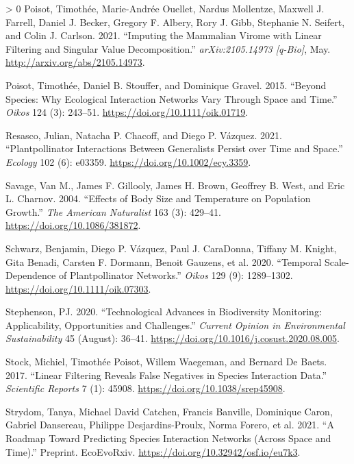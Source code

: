 \documentclass[10pt,oneside]{article}
\newlength{\cslhangindent}
\newenvironment{CSLReferences}[3] %
 {%
  \setlength{\parindent}{0pt}
  \ifodd #1 \everypar{\setlength{\hangindent}{\cslhangindent}}\ignorespaces\fi
  \ifnum #2 > 0
  \setlength{\parskip}{#2\baselineskip}
  \fi
 }%
 {}
\begin{document}
\begin{CSLReferences}{1}{0}
\leavevmode\hypertarget{ref-Poisot2021ImpMam}{}%
Poisot, Timothée, Marie-Andrée Ouellet, Nardus Mollentze, Maxwell J.
Farrell, Daniel J. Becker, Gregory F. Albery, Rory J. Gibb, Stephanie N.
Seifert, and Colin J. Carlson. 2021. {``Imputing the Mammalian Virome
with Linear Filtering and Singular Value Decomposition.''}
\emph{arXiv:2105.14973 {[}q-Bio{]}}, May.
\url{http://arxiv.org/abs/2105.14973}.

\leavevmode\hypertarget{ref-Poisot2015SpeWhy}{}%
Poisot, Timothée, Daniel B. Stouffer, and Dominique Gravel. 2015.
{``Beyond Species: Why Ecological Interaction Networks Vary Through
Space and Time.''} \emph{Oikos} 124 (3): 243--51.
\url{https://doi.org/10.1111/oik.01719}.

\leavevmode\hypertarget{ref-Resasco2021PlaPol}{}%
Resasco, Julian, Natacha P. Chacoff, and Diego P. Vázquez. 2021.
{``Plantpollinator Interactions Between Generalists Persist over Time
and Space.''} \emph{Ecology} 102 (6): e03359.
\url{https://doi.org/10.1002/ecy.3359}.

\leavevmode\hypertarget{ref-Savage2004EffBod}{}%
Savage, Van M., James F. Gillooly, James H. Brown, Geoffrey B. West, and
Eric L. Charnov. 2004. {``Effects of Body Size and Temperature on
Population Growth.''} \emph{The American Naturalist} 163 (3): 429--41.
\url{https://doi.org/10.1086/381872}.

\leavevmode\hypertarget{ref-Schwarz2020TemSca}{}%
Schwarz, Benjamin, Diego P. Vázquez, Paul J. CaraDonna, Tiffany M.
Knight, Gita Benadi, Carsten F. Dormann, Benoit Gauzens, et al. 2020.
{``Temporal Scale-Dependence of Plantpollinator Networks.''}
\emph{Oikos} 129 (9): 1289--1302.
\url{https://doi.org/10.1111/oik.07303}.

\leavevmode\hypertarget{ref-Stephenson2020TecAdv}{}%
Stephenson, PJ. 2020. {``Technological Advances in Biodiversity
Monitoring: Applicability, Opportunities and Challenges.''}
\emph{Current Opinion in Environmental Sustainability} 45 (August):
36--41. \url{https://doi.org/10.1016/j.cosust.2020.08.005}.

\leavevmode\hypertarget{ref-Stock2017LinFil}{}%
Stock, Michiel, Timothée Poisot, Willem Waegeman, and Bernard De Baets.
2017. {``Linear Filtering Reveals False Negatives in Species Interaction
Data.''} \emph{Scientific Reports} 7 (1): 45908.
\url{https://doi.org/10.1038/srep45908}.

\leavevmode\hypertarget{ref-Strydom2021RoaPre}{}%
Strydom, Tanya, Michael David Catchen, Francis Banville, Dominique
Caron, Gabriel Dansereau, Philippe Desjardins-Proulx, Norma Forero, et
al. 2021. {``A Roadmap Toward Predicting Species Interaction Networks
(Across Space and Time).''} Preprint. EcoEvoRxiv.
\url{https://doi.org/10.32942/osf.io/eu7k3}.


\end{CSLReferences}
\end{document}
